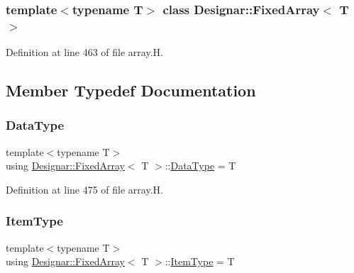 \subsubsection*{template$<$typename T$>$\newline
class Designar\+::\+Fixed\+Array$<$ T $>$}



Definition at line 463 of file array.\+H.



\subsection{Member Typedef Documentation}
\mbox{\label{class_designar_1_1_fixed_array_a3e37931b909b840cb7a40fc73f12bcf5}} 
\subsubsection{\texorpdfstring{Data\+Type}{DataType}}
{\footnotesize\ttfamily template$<$typename T$>$ \\
using \hyperlink{class_designar_1_1_fixed_array}{Designar\+::\+Fixed\+Array}$<$ T $>$\+::\hyperlink{class_designar_1_1_fixed_array_a3e37931b909b840cb7a40fc73f12bcf5}{Data\+Type} =  T}



Definition at line 475 of file array.\+H.

\mbox{\label{class_designar_1_1_fixed_array_abfeb4e683cee75ae782ad20294c4c808}} 
\subsubsection{\texorpdfstring{Item\+Type}{ItemType}}
{\footnotesize\ttfamily template$<$typename T$>$ \\
using \hyperlink{class_designar_1_1_fixed_array}{Designar\+::\+Fixed\+Array}$<$ T $>$\+::\hyperlink{class_designar_1_1_fixed_array_abfeb4e683cee75ae782ad20294c4c808}{Item\+Type} =  T}



